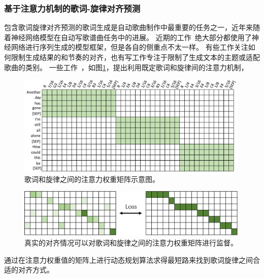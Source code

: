 \subsubsection{基于注意力机制的歌词-旋律对齐预测}
包含歌词旋律对齐预测的歌词生成是自动歌曲制作中最重要的任务之一，近年来随着神经网络模型在自动写歌谱曲任务中的进展。
近期的工作~\citep{lee-etal-2019-icomposer,Chen2020MelodyConditionedLG,songmass,telemelody,ai_lyricist,xue-etal-2021-deeprapper}绝大部分都使用了神经网络进行序列生成的模型框架，但是各自的侧重点不太一样。
有些工作关注如何限制生成结果的和节奏的对齐，也有写工作专注于限制了生成文本的主题或适配歌曲的类别。
一些工作~\citep{songmass,telemelody}，如图\ref{fig:attn_diag}，提出利用既定歌词和旋律间的注意力机制，
\begin{figure}[ht]
  \includegraphics[width=0.99\textwidth]{figure/related/digattn.pdf}
  \caption{歌词和旋律之间的注意力权重矩阵示意图。}
  \label{fig:attn_diag}
\end{figure}
\begin{figure}[ht]
  \includegraphics[width=0.99\textwidth]{figure/related/GuidedAttention.png}
  \caption{真实的对齐情况可以对歌词和旋律之间的注意力权重矩阵进行监督。}
  \label{fig:attn_loss}
\end{figure}
通过在注意力权重值的矩阵上进行动态规划算法求得最短路来找到歌词旋律之间合适的对齐方式。
